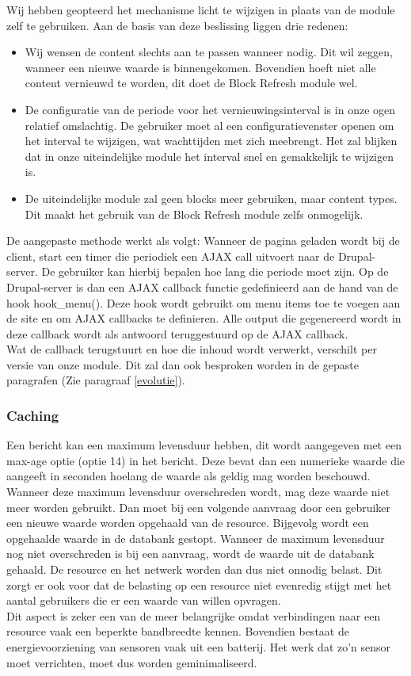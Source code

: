 Wij hebben geopteerd het mechanisme licht te wijzigen in plaats van de module zelf te gebruiken. Aan de basis van deze beslissing liggen drie redenen:
\begin{itemize}
\item Wij wensen de content slechts aan te passen wanneer nodig. Dit wil zeggen, wanneer een nieuwe waarde is binnengekomen. Bovendien hoeft niet alle content vernieuwd te worden, dit doet de Block Refresh module wel.
\item De configuratie van de periode voor het vernieuwingsinterval is in onze ogen relatief omslachtig. De gebruiker moet al een configuratievenster openen om het interval te wijzigen, wat wachttijden met zich meebrengt. Het zal blijken dat in onze uiteindelijke module het interval snel en gemakkelijk te wijzigen is. 
\item De uiteindelijke module zal geen blocks meer gebruiken, maar content types. Dit maakt het gebruik van de Block Refresh module zelfs onmogelijk.
\end{itemize}

De aangepaste methode werkt als volgt: Wanneer de pagina geladen wordt bij de client, start een timer die periodiek een AJAX call uitvoert naar de Drupal-server. De gebruiker kan hierbij bepalen hoe lang die periode moet zijn. Op de Drupal-server is dan een AJAX callback functie gedefinieerd aan de hand van de hook hook\_menu(). Deze hook wordt gebruikt om menu items toe te voegen aan de site en om AJAX callbacks te definieren. Alle output die gegenereerd wordt in deze callback wordt als antwoord teruggestuurd op de AJAX callback.\\

Wat de callback terugstuurt en hoe die inhoud wordt verwerkt, verschilt per versie van onze module. Dit zal dan ook besproken worden in de gepaste paragrafen (Zie paragraaf \ref{evolutie}).

\subsubsection{Caching}\label{caching}
Een bericht kan een maximum levensduur hebben, dit wordt aangegeven met een max-age optie (optie 14) in het bericht. Deze bevat dan een numerieke waarde die aangeeft in seconden hoelang de waarde als geldig mag worden beschouwd. Wanneer deze maximum levensduur overschreden wordt, mag deze waarde niet meer worden gebruikt. Dan moet bij een volgende aanvraag door een gebruiker een nieuwe waarde worden opgehaald van de resource. Bijgevolg wordt een opgehaalde waarde in de databank gestopt. Wanneer de maximum levensduur nog niet overschreden is bij een aanvraag, wordt de waarde uit de databank gehaald. De resource en het netwerk worden dan dus niet onnodig belast. Dit zorgt er ook voor dat de belasting op een resource niet evenredig stijgt met het aantal gebruikers die er een waarde van willen opvragen.\\
Dit aspect is zeker een van de meer belangrijke omdat verbindingen naar een resource vaak een beperkte bandbreedte kennen. Bovendien bestaat de energievoorziening van sensoren vaak uit een batterij. Het werk dat zo'n sensor moet verrichten, moet dus worden geminimaliseerd.

